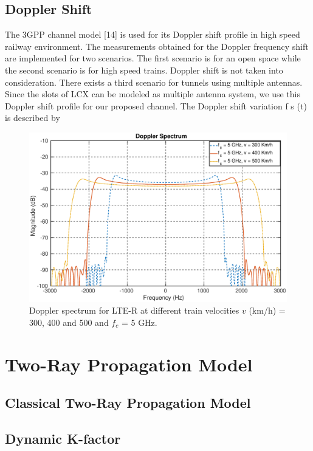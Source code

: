 \subsection{Doppler Shift}
The 3GPP channel model [14] is used for its Doppler shift profile in high speed railway environment. The measurements
obtained for the Doppler frequency shift are implemented for two scenarios. The first scenario is for an open space while
the second scenario is for high speed trains. Doppler shift is not taken into consideration. There exists a third scenario for
tunnels using multiple antennas. Since the slots of LCX can be modeled as multiple antenna system, we use this Doppler shift
profile for our proposed channel. The Doppler shift variation f s (t) is described by

\begin{figure}[!ht]
\label{doppler}
\centering
\includegraphics[width=\linewidth,keepaspectratio]{images/Gill/lte_figs/dopplerspectrum.eps} 
\caption{Doppler spectrum for LTE-R at different train velocities $v$ (km/h) = 300, 400 and 500 and $f_c$ = 5 GHz.}
\end{figure}

\section{Two-Ray Propagation Model}

\subsection{Classical Two-Ray Propagation Model}



\subsection{Dynamic K-factor}

